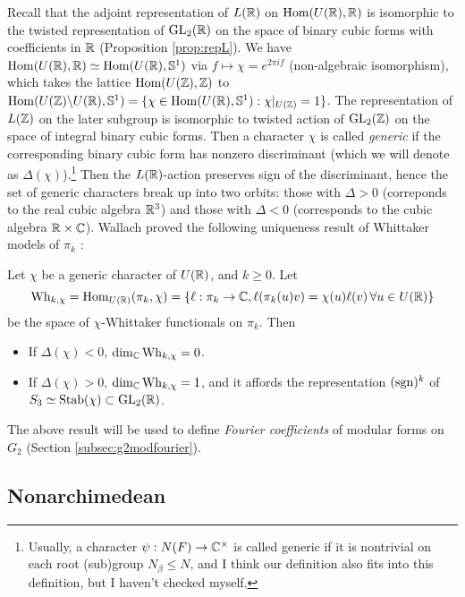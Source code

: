 Recall that the adjoint representation of $L(\mathbb{R})$ on $\mathrm{Hom}(U(\mathbb{R}), \mathbb{R})$ is isomorphic to the twisted representation of $\mathrm{GL}_2(\mathbb{R})$ on the space of binary cubic forms with coefficients in $\mathbb{R}$ (Proposition \ref{prop:repL}).
We have $\mathrm{Hom}(U(\mathbb{R}), \mathbb{R}) \simeq \mathrm{Hom}(U(\mathbb{R}), \mathbb{S}^1)$ via $f \mapsto \chi = e^{2 \pi i f}$ (non-algebraic isomorphism), which takes the lattice $\mathrm{Hom}(U(\mathbb{Z}), \mathbb{Z})$ to $\mathrm{Hom}(U(\mathbb{Z}) \backslash U(\mathbb{R}), \mathbb{S}^1) = \{ \chi \in \mathrm{Hom}(U(\mathbb{R}), \mathbb{S}^1): \chi|_{U(\mathbb{Z})} = 1\}$.
The representation of $L(\mathbb{Z})$ on the later subgroup is isomorphic to twisted action of $\mathrm{GL}_2(\mathbb{Z})$ on the space of integral binary cubic forms.
Then a character $\chi$ is called \emph{generic} if the corresponding binary cubic form has nonzero discriminant (which we will denote as $\Delta(\chi)$).\footnote{Usually, a character $\psi: N(F) \to \mathbb{C}^\times$ is called generic if it is nontrivial on each root (sub)group $N_\beta \le N$, and I think our definition also fits into this definition, but I haven't checked myself.}
Then the $L(\mathbb{R})$-action preserves sign of the discriminant, hence the set of generic characters break up into two orbits: those with $\Delta > 0$ (correponds to the real cubic algebra $\mathbb{R}^3$) and those with $\Delta < 0$ (corresponds to the cubic algebra $\mathbb{R} \times \mathbb{C}$).
Wallach proved the following uniqueness result of Whittaker models of $\pi_k$ \cite{wallach2003generalized}:

\begin{proposition}
\label{prop:chihom}
    Let $\chi$ be a generic character of $U(\mathbb{R})$, and $k \ge 0$.
    Let
    $$
    \mathrm{Wh}_{k, \chi} = \mathrm{Hom}_{U(\mathbb{R})}(\pi_k, \chi) = \{\ell: \pi_k \to \mathbb{C}, \ell(\pi_k(u)v) = \chi(u) \ell(v) \,\forall u \in U(\mathbb{R})\}
    $$
    be the space of $\chi$-Whittaker functionals on $\pi_k$. Then
    \begin{itemize}
        \item If $\Delta(\chi) < 0$, $\dim_{\mathbb{C}} \mathrm{Wh}_{k, \chi} = 0$.
        \item If $\Delta(\chi) > 0$, $\dim_{\mathbb{C}} \mathrm{Wh}_{k, \chi} = 1$, and it affords the representation $(\mathrm{sgn})^k$ of $S_3 \simeq \mathrm{Stab}(\chi) \subset \mathrm{GL}_2(\mathbb{R})$.
    \end{itemize}
\end{proposition}
The above result will be used to define \emph{Fourier coefficients} of modular forms on $G_2$ (Section \ref{subsec:g2modfourier}).

\subsection{Nonarchimedean}
\label{subsec:nonarch}

